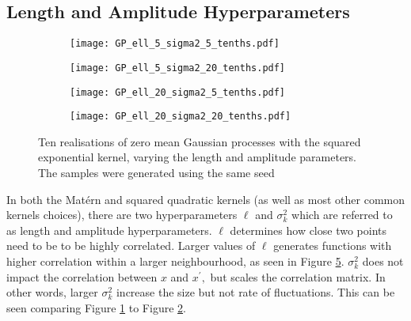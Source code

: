 \subsection*{Length and Amplitude Hyperparameters}

\begin{figure}[htbp]
    \centering
    \begin{subfigure}[b]{0.5\textwidth}
        \centering
        \texttt{[image: GP\_ell\_5\_sigma2\_5\_tenths.pdf]}
        \label{fig:half_half}
    \end{subfigure}%
    \hfill%
    \begin{subfigure}[b]{0.5\textwidth}
        \centering
        \texttt{[image: GP\_ell\_5\_sigma2\_20\_tenths.pdf]}
        \label{fig:half_two}
    \end{subfigure}
    \begin{subfigure}[b]{0.5\textwidth}
        \centering
        \texttt{[image: GP\_ell\_20\_sigma2\_5\_tenths.pdf]}
        \label{fig:two_half}
    \end{subfigure}%
    \hfill%
    \begin{subfigure}[b]{0.5\textwidth}
        \centering
        \texttt{[image: GP\_ell\_20\_sigma2\_20\_tenths.pdf]}
        \label{fig:two_two}
    \end{subfigure}%
    \caption{
        Ten realisations of zero mean Gaussian processes with the squared
        exponential kernel, varying the length and amplitude parameters.
        The samples were generated using the same seed
    }
    \label{fig:length_amp}
\end{figure}

In both the Mat\'ern and squared quadratic kernels
(as well as most other common kernels choices), there are two
hyperparameters $\ell$ and $\sigma^2_k$ which are referred to as length and
amplitude hyperparameters. $\ell$ determines how close two points need
to be to be highly correlated. Larger values of $\ell$ generates functions with
higher correlation within a larger neighbourhood,
as seen in Figure \ref{fig:length_amp}. $\sigma^2_k$ does not impact
the correlation between $x$ and $x^\prime,$ but scales the correlation
matrix. In other words, larger $\sigma^2_k$ increase the size but not rate of
fluctuations. This can be seen comparing Figure \ref{fig:half_half} to Figure
\ref{fig:half_two}.

